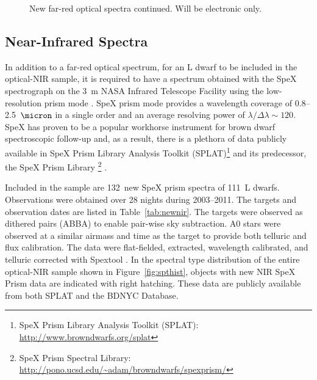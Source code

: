 \documentclass[modern,trackchanges]{aastex61}
\newcommand{\NewPrismSpectra}{132} %
\newcommand{\NewPrismObjects}{111} %
\begin{document}
\begin{figure}
    \caption{New far-red optical spectra continued. Will be electronic only.}
\end{figure}
\clearpage



\subsection{Near-Infrared Spectra}

In addition to a far-red optical spectrum, for an L dwarf to be included in the optical-NIR sample, it is required to have a spectrum obtained with the SpeX spectrograph on the 3~m NASA Infrared Telescope Facility using the low-resolution prism mode \citep{Spex}.
SpeX prism mode provides a wavelength coverage of 0.8--2.5~$\micron$ in a single order and an average resolving power of $\lambda/\Delta\lambda\sim120$.
SpeX has proven to be a popular workhorse instrument for brown dwarf spectroscopic follow-up and, as a result, there is a plethora of data publicly available in SpeX Prism Library Analysis Toolkit (SPLAT)\footnote{SpeX Prism Library Analysis Toolkit (SPLAT): \url{http://www.browndwarfs.org/splat}} and its predecessor, the SpeX Prism Library \footnote{SpeX Prism Spectral Library: \url{http://pono.ucsd.edu/~adam/browndwarfs/spexprism/}} \citep{Burgasser:2014tr}.

\label{sec:obs_new_nir}
Included in the sample are \NewPrismSpectra~new SpeX prism spectra of \NewPrismObjects~L dwarfs.
Observations were obtained over 28 nights during 2003--2011. The targets and observation dates are listed in Table~\ref{tab:newnir}.
The targets were observed as dithered pairs (ABBA) to enable pair-wise sky subtraction. A0 stars were observed at a similar airmass and time as the target to provide both telluric and flux calibration.
The data were flat-fielded, extracted, wavelength calibrated, and telluric corrected with Spextool \citep{Cushing04,Spextool2}.
In the spectral type distribution of the entire optical-NIR sample shown in Figure~\ref{fig:spthist}, objects with new NIR SpeX Prism data are indicated with right hatching.
These data are publicly available from both SPLAT and the BDNYC Database.
\end{document}
